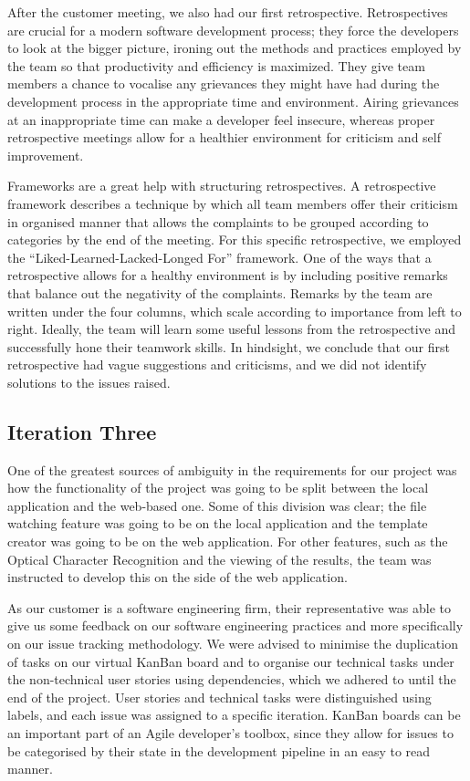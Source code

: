 \documentclass{l3proj}
\begin{document}
After the customer meeting, we also had our first retrospective. Retrospectives are crucial for a modern software development process; they force the developers to look at the bigger picture, ironing out the methods and practices employed by the team so that productivity and efficiency is maximized. They give team members a chance to vocalise any grievances they might have had during the development process in the appropriate time and environment. Airing grievances at an inappropriate time can make a developer feel insecure, whereas proper retrospective meetings allow for a healthier environment for criticism and self improvement.

Frameworks are a great help with structuring retrospectives. A retrospective framework describes a technique by which all team members offer their criticism in organised manner that allows the complaints to be grouped according to categories by the end of the meeting. For this specific retrospective, we employed the ``Liked-Learned-Lacked-Longed For'' framework. One of the ways that a retrospective allows for a healthy environment is by including positive remarks that balance out the negativity of the complaints. Remarks by the team are written under the four columns, which scale according to importance from left to right. Ideally, the team will learn some useful lessons from the retrospective and successfully hone their teamwork skills. In hindsight, we conclude that our first retrospective had vague suggestions and criticisms, and we did not identify solutions to the issues raised.

\subsection{Iteration Three}

One of the greatest sources of ambiguity in the requirements for our project was how the functionality of the project was going to be split between the local application and the web-based one. Some of this division was clear; the file watching feature was going to be on the local application and the template creator was going to be on the web application. For other features, such as the Optical Character Recognition and the viewing of the results, the team was instructed to develop this on the side of the web application.

As our customer is a software engineering firm, their representative was able to give us some feedback on our software engineering practices and more specifically on our issue tracking methodology. We were advised to minimise the duplication of tasks on our virtual KanBan board and to organise our technical tasks under the non-technical user stories using dependencies, which we adhered to until the end of the project. User stories and technical tasks were distinguished using labels, and each issue was assigned to a specific iteration. KanBan boards can be an important part of an Agile developer’s toolbox, since they allow for issues to be categorised by their state in the development pipeline in an easy to read manner.
\end{document}
